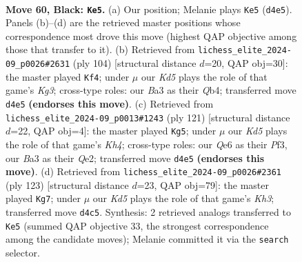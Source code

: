 \documentclass[11pt]{article}
\begin{document}
\clearpage

\begin{figure}[p]\centering
\begin{subfigure}{0.46\textwidth}\centering
\resizebox{\linewidth}{!}{%
\newchessgame
\chessboard[
  setfen={8/8/4q3/8/Rp1k4/b4B2/6K1/8 b - - 11 60},
  showmover=false,
  pgfstyle=straightmove, color=movearrow, markmove={d4-e5}
]}
\caption{}
\end{subfigure}\hfill
\begin{subfigure}{0.46\textwidth}\centering
\resizebox{\linewidth}{!}{%
\newchessgame
\chessboard[
  setfen={8/1r6/1Pk5/3b4/1Q6/6K1/8/8 w - - 16 53},
  showmover=false,
  pgfstyle=straightmove, color=movearrow, markmove={g3-f4}
]}
\caption{}
\end{subfigure}
\\[4pt]
\begin{subfigure}{0.46\textwidth}\centering
\resizebox{\linewidth}{!}{%
\newchessgame
\chessboard[
  setfen={8/8/5R1p/7k/3B4/2K2p2/4q3/8 b - - 5 61},
  showmover=false,
  pgfstyle=straightmove, color=movearrow, markmove={h5-g5}
]}
\caption{}
\end{subfigure}\hfill
\begin{subfigure}{0.46\textwidth}\centering
\resizebox{\linewidth}{!}{%
\newchessgame
\chessboard[
  setfen={8/8/5Rpk/5b2/5K2/8/8/8 b - - 8 62},
  showmover=false,
  pgfstyle=straightmove, color=movearrow, markmove={h6-g7}
]}
\caption{}
\end{subfigure}
\caption{\textbf{Move 60, Black: \texttt{Ke5}.} (a) Our position; Melanie plays \texttt{Ke5} (\texttt{d4e5}). Panels (b)--(d) are the retrieved master positions whose correspondence most drove this move (highest QAP objective among those that transfer to it). (b) Retrieved from \texttt{lichess\_elite\_2024-09\_p0026\#2631} (ply 104) [structural distance $d$=20, QAP obj=30]: the master played \texttt{Kf4}; under $\mu$ our \emph{Kd5} plays the role of that game's \emph{Kg3}; cross-type roles: our \emph{B}a3 as their \emph{Q}b4; transferred move \texttt{d4e5} \textbf{(endorses this move)}. (c) Retrieved from \texttt{lichess\_elite\_2024-09\_p0013\#1243} (ply 121) [structural distance $d$=22, QAP obj=4]: the master played \texttt{Kg5}; under $\mu$ our \emph{Kd5} plays the role of that game's \emph{Kh4}; cross-type roles: our \emph{Q}e6 as their \emph{P}f3, our \emph{B}a3 as their \emph{Q}e2; transferred move \texttt{d4e5} \textbf{(endorses this move)}. (d) Retrieved from \texttt{lichess\_elite\_2024-09\_p0026\#2361} (ply 123) [structural distance $d$=23, QAP obj=79]: the master played \texttt{Kg7}; under $\mu$ our \emph{Kd5} plays the role of that game's \emph{Kh3}; transferred move \texttt{d4c5}. Synthesis: 2 retrieved analogs transferred to \texttt{Ke5} (summed QAP objective 33, the strongest correspondence among the candidate moves); Melanie committed it via the \texttt{search} selector.}
\label{fig:thought-m119}
\end{figure}
\end{document}

